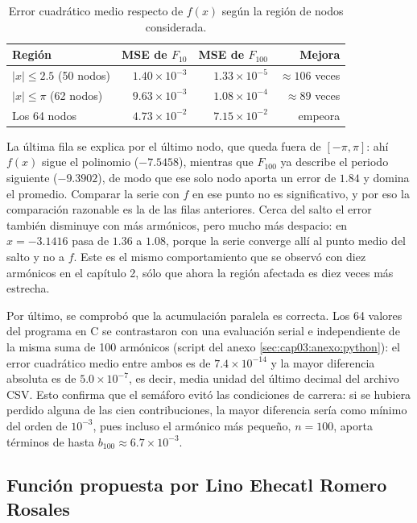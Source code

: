 \begin{table}[H]
    \centering
    \caption{Error cuadrático medio respecto de $f(x)$ según la región de nodos considerada.}
    \label{tab:cap03:aaron:mse}
    \begin{tabular}{lrrr}
        \toprule
        Región & MSE de $F_{10}$ & MSE de $F_{100}$ & Mejora \\
        \midrule
        $|x| \le 2.5$ (50 nodos) & $1.40\times10^{-3}$ & $1.33\times10^{-5}$ & $\approx 106$ veces \\
        $|x| \le \pi$ (62 nodos) & $9.63\times10^{-3}$ & $1.08\times10^{-4}$ & $\approx 89$ veces \\
        Los 64 nodos & $4.73\times10^{-2}$ & $7.15\times10^{-2}$ & empeora \\
        \bottomrule
    \end{tabular}
\end{table}

La última fila se explica por el último nodo, que queda fuera de $[-\pi, \pi]$: ahí $f(x)$ sigue el polinomio ($-7.5458$), mientras que $F_{100}$ ya describe el periodo siguiente ($-9.3902$), de modo que ese solo nodo aporta un error de $1.84$ y domina el promedio. Comparar la serie con $f$ en ese punto no es significativo, y por eso la comparación razonable es la de las filas anteriores. Cerca del salto el error también disminuye con más armónicos, pero mucho más despacio: en $x = -3.1416$ pasa de $1.36$ a $1.08$, porque la serie converge allí al punto medio del salto y no a $f$. Este es el mismo comportamiento que se observó con diez armónicos en el capítulo 2, sólo que ahora la región afectada es diez veces más estrecha.

Por último, se comprobó que la acumulación paralela es correcta. Los 64 valores del programa en C se contrastaron con una evaluación serial e independiente de la misma suma de 100 armónicos (script del anexo \ref{sec:cap03:anexo:python}): el error cuadrático medio entre ambos es de $7.4\times10^{-14}$ y la mayor diferencia absoluta es de $5.0\times10^{-7}$, es decir, media unidad del último decimal del archivo CSV. Esto confirma que el semáforo evitó las condiciones de carrera: si se hubiera perdido alguna de las cien contribuciones, la mayor diferencia sería como mínimo del orden de $10^{-3}$, pues incluso el armónico más pequeño, $n = 100$, aporta términos de hasta $b_{100} \approx 6.7\times10^{-3}$.

\subsection{Función propuesta por Lino Ehecatl Romero Rosales}
\label{sec:cap03:lino}

